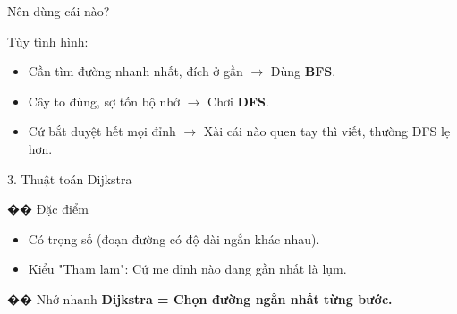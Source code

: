 \documentclass[11pt]{beamer}
\begin{document}
\begin{frame}{Nên dùng cái nào?}
    \begin{exampleblock}{Tùy tình hình:}
        \begin{itemize}
            \item Cần tìm đường nhanh nhất, đích ở gần $\rightarrow$ Dùng \textbf{BFS}.
            \item Cây to đùng, sợ tốn bộ nhớ $\rightarrow$ Chơi \textbf{DFS}.
            \item Cứ bắt duyệt hết mọi đỉnh $\rightarrow$ Xài cái nào quen tay thì viết, thường DFS lẹ hơn.
        \end{itemize}
    \end{exampleblock}
\end{frame}

\begin{frame}{3. Thuật toán Dijkstra}
    \begin{block}{�� Đặc điểm}
        \begin{itemize}
            \item Có trọng số (đoạn đường có độ dài ngắn khác nhau).
            \item Kiểu "Tham lam": Cứ me đỉnh nào đang gần nhất là lụm.
        \end{itemize}
    \end{block}
    
    \begin{exampleblock}{�� Nhớ nhanh}
        \textbf{Dijkstra = Chọn đường ngắn nhất từng bước.}
    \end{exampleblock}
\end{frame}
\end{document}
